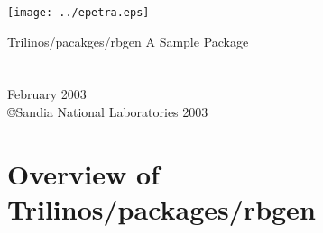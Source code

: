 \documentclass[letterpaper]{book}
\begin{document}
\begin{titlepage}
\texttt{[image: ../epetra.eps]}
\begin{center}
{\Huge Trilinos/pacakges/rbgen A Sample Package\\[1ex]\large }\\
\vspace*{1cm}\\
\vspace*{0.5cm}
{\small February 2003}\\
\copyright Sandia National Laboratories 2003
\end{center}
\end{titlepage}
\clearemptydoublepage
{}
\tableofcontents
\clearemptydoublepage
{}
\chapter{Overview of Trilinos/packages/rbgen}

\end{document}
